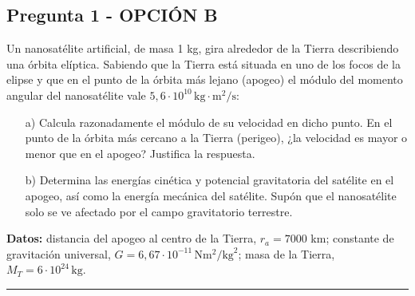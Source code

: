 \newpage
\subsection{Pregunta 1 - OPCIÓN B}
\label{subsec:1B_2025_jul_ord}

\begin{cajaenunciado}
Un nanosatélite artificial, de masa 1 kg, gira alrededor de la Tierra describiendo una órbita elíptica. Sabiendo que la Tierra está situada en uno de los focos de la elipse y que en el punto de la órbita más lejano (apogeo) el módulo del momento angular del nanosatélite vale $5,6\cdot10^{10}\,\text{kg}\cdot\text{m}^2/\text{s}$:
\begin{enumerate}
    \item[a)] Calcula razonadamente el módulo de su velocidad en dicho punto. En el punto de la órbita más cercano a la Tierra (perigeo), ¿la velocidad es mayor o menor que en el apogeo? Justifica la respuesta.
    \item[b)] Determina las energías cinética y potencial gravitatoria del satélite en el apogeo, así como la energía mecánica del satélite. Supón que el nanosatélite solo se ve afectado por el campo gravitatorio terrestre.
\end{enumerate}
\textbf{Datos:} distancia del apogeo al centro de la Tierra, $r_{a}=7000$ km; constante de gravitación universal, $G=6,67\cdot10^{-11}\,\text{N}\text{m}^2/\text{kg}^2$; masa de la Tierra, $M_{T}=6\cdot10^{24}\,\text{kg}$.
\end{cajaenunciado}
\hrule

